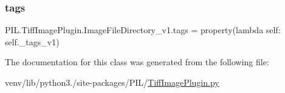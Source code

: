 \subsubsection{\texorpdfstring{tags}{tags}}
{\footnotesize\ttfamily P\+I\+L.\+Tiff\+Image\+Plugin.\+Image\+File\+Directory\+\_\+v1.\+tags = property(lambda self\+: self.\+\_\+tags\+\_\+v1)\hspace{0.3cm}{\ttfamily [static]}}



The documentation for this class was generated from the following file\+:\begin{DoxyCompactItemize}
\item 
venv/lib/python3./site-\/packages/\+P\+I\+L/\hyperlink{TiffImagePlugin_8py}{Tiff\+Image\+Plugin.\+py}\end{DoxyCompactItemize}
